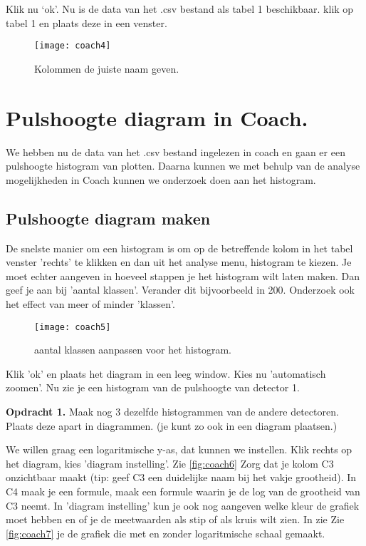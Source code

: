 Klik nu `ok'. Nu is de data van het .csv bestand als tabel 1 beschikbaar.
klik op tabel 1 en plaats deze in een venster.

\begin{figure}
    \centering
    \texttt{[image: coach4]}
    \caption{Kolommen de juiste naam geven.}
    \label{fig:coach4}
\end{figure}


\section{Pulshoogte diagram in Coach.}

We hebben nu de data van het .csv bestand ingelezen in coach en gaan er een
pulshoogte histogram van plotten. Daarna kunnen we met behulp van de analyse 
mogelijkheden in Coach kunnen we onderzoek doen aan het histogram.

\subsection{Pulshoogte diagram maken}

De snelste manier om een histogram is om op de betreffende kolom in het tabel venster
'rechts' te klikken en dan uit het analyse menu, histogram te kiezen.
Je moet echter aangeven in hoeveel stappen je het histogram wilt laten maken.
Dan geef je aan bij 'aantal klassen'. Verander dit bijvoorbeeld in 200. Onderzoek
ook het effect van meer of minder 'klassen'.

\begin{figure}
    \centering
    \texttt{[image: coach5]}
    \caption{aantal klassen aanpassen voor het histogram.}
    \label{fig:coach5}
\end{figure}

Klik 'ok' en plaats het diagram in een leeg window. Kies nu 'automatisch zoomen'.
Nu zie je een histogram van de pulshoogte van detector 1.

\textbf{Opdracht 1.}
Maak nog 3 dezelfde histogrammen van de andere detectoren. Plaats deze apart in diagrammen.
(je kunt zo ook in een diagram plaatsen.)

We willen graag een logaritmische y-as, dat kunnen we instellen.
Klik rechts op het diagram, kies 'diagram instelling'. Zie \ref{fig:coach6}
Zorg dat je kolom C3 onzichtbaar maakt (tip: geef C3 een duidelijke naam bij het vakje
grootheid). In C4 maak je een formule, maak een formule waarin je de log van
de grootheid van C3 neemt. In 'diagram instelling' kun je ook nog aangeven welke 
kleur de grafiek moet hebben en of je de meetwaarden als stip of als kruis wilt 
zien. In zie Zie \ref{fig:coach7} je de grafiek die met en zonder logaritmische schaal gemaakt.


